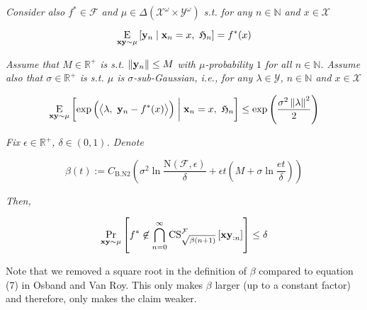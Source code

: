 \documentclass[a4paper]{article}
\newcommand{\Co}[1]{}
\newcommand{\AP}[1]{\left(#1\right)}
\newcommand{\AB}[1]{\left[#1\right]}
\newcommand{\ABM}[2]{\left[#1\;\middle\vert\;#2\right]}
\newcommand{\Pa}[2]{\underset{#1}{\operatorname{Pr}}\AB{#2}}
\newcommand{\CE}[3]{\underset{#1}{\operatorname{E}}\ABM{#2}{#3}}
\newcommand{\Nats}{\mathbb{N}}
\newcommand{\Reals}{\mathbb{R}}
\newcommand{\Norm}[1]{\left\Vert #1 \right\Vert}
\newcommand{\Chev}[1]{\left\langle #1 \right\rangle}
\newcommand{\X}{\mathcal{X}}
\newcommand{\Y}{\mathcal{Y}}
\newcommand{\F}{\mathcal{F}}
\newcommand{\N}{\mathrm{N}}
\newcommand{\CS}{\mathrm{CS}}
\begin{document}
\textit{Consider also $f^*\in\F$ and $\mu\in\Delta\AP{\X^\omega\times\Y^\omega}$ s.t. for any $n\in\Nats$ and $x\in\X$}\Co{i}

$$\CE{\bold{xy}\sim\mu}{\bold{y}_n}{\bold{x}_n=x,\ \mathfrak{H}_n} = f^*(x)$$

\textit{Assume that $M\in\Reals^+$ is s.t. $\Norm{\bold{y}_n}\leq M$ with $\mu$-probability $1$ for all $n\in\Nats$. Assume also that $\sigma\in\Reals^+$ is s.t. $\mu$ is $\sigma$-sub-Gaussian, i.e., for any $\lambda\in\Y$, $n\in\Nats$ and $x\in\X$}\Co{i}

$$\CE{\bold{xy}\sim\mu}{\exp\AP{\Chev{\lambda,\ \bold{y}_n-f^*(x)}}}{\bold{x}_n=x,\ \mathfrak{H}_n} \leq \exp\AP{\frac{\sigma^2\Norm{\lambda}^2}{2}}$$

\textit{Fix $\epsilon\in\Reals^+$, $\delta\in(0,1)$. Denote}\Co{i}

$$\beta(t):=C_{\mathrm{B.N2}}\AP{\sigma^2 \ln{\frac{\N(\F,\epsilon)}{\delta}}+\epsilon t\AP{M+\sigma\ln{\frac{et}{\delta}}}}$$

\textit{Then,}\Co{i}

$$\Pa{\bold{xy}\sim\mu}{f^*\not\in\bigcap_{n=0}^\infty\CS^\F_{\sqrt{\beta(n+1)}}\AB{\bold{xy}_{:n}}} \leq \delta$$

Note that we removed a square root in the definition of $\beta$ compared to equation (7) in Osband and Van Roy. This only makes $\beta$ larger (up to a constant factor) and therefore, only makes the claim weaker.
\end{document}
